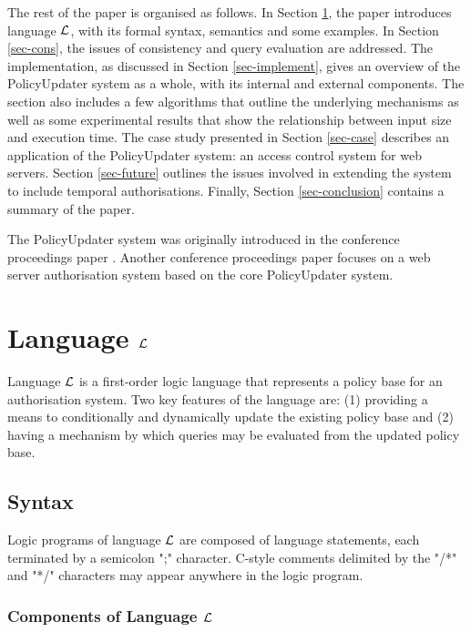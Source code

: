 \documentclass[glov2,twocolumn,final]{svjour2}
\begin{document}
    The rest of the paper is organised as follows. In Section \ref{sec-langl},
    the paper introduces language ${\cal L}$, with its formal syntax, semantics
    and some examples. In Section \ref{sec-cons}, the issues of consistency and
    query evaluation are addressed. The implementation, as discussed in Section
    \ref{sec-implement}, gives an overview of the PolicyUpdater system as
    a whole, with its internal and external components. The section also
    includes a few algorithms that outline the underlying mechanisms as well as
    some experimental results that show the relationship between input size
    and execution time. The case study presented in Section \ref{sec-case}
    describes an application of the PolicyUpdater system: an access control
    system for web servers. Section \ref{sec-future} outlines the issues
    involved in extending the system to include temporal authorisations.
    Finally, Section \ref{sec-conclusion} contains a summary of the paper.

    The PolicyUpdater system was originally introduced in the conference
    proceedings paper \cite{CR1}. Another conference proceedings paper
    \cite{CR2} focuses on a web server authorisation system based on the
    core PolicyUpdater system.

  \section{Language $\cal{L}$}
    \label{sec-langl}

    Language $\cal{L}$ is a first-order logic language that represents a policy
    base for an authorisation system. Two key features of the language are: (1)
    providing a means to conditionally and dynamically update the existing
    policy base and (2) having a mechanism by which queries may be evaluated
    from the updated policy base.

    \subsection{Syntax}
      \label{subsec-syntax}

      Logic programs of language ${\cal L}$ are composed of language
      statements, each terminated by a semicolon ";" character. C-style
      comments delimited by the "/*" and "*/" characters may appear anywhere in
      the logic program.

      \subsubsection{Components of Language $\cal{L}$}
\end{document}
